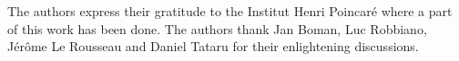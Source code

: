 \documentclass[final,leqno]{siamart1116}
\begin{document}
\medskip
{}  The authors express their gratitude
to the Institut Henri Poincar\'e where a part of this work has been
done.  The authors thank Jan Boman, Luc Robbiano, J\'{e}r\^{o}me Le
Rousseau and Daniel Tataru for their enlightening discussions.

\clearpage


\end{document}
